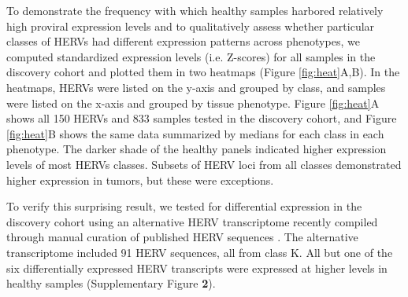 To demonstrate the frequency with which healthy samples harbored relatively high proviral expression levels and to qualitatively assess whether particular classes of HERVs had different expression patterns across phenotypes, we computed standardized expression levels (i.e. Z-scores) for all samples in the discovery cohort and plotted them in two heatmaps (Figure \ref{fig:heat}A,B).
In the heatmaps, HERVs were listed on the y-axis and grouped by class, and samples were listed on the x-axis and grouped by tissue phenotype.
Figure \ref{fig:heat}A shows all 150 HERVs and 833 samples tested in the discovery cohort, and Figure \ref{fig:heat}B shows the same data summarized by medians for each class in each phenotype.
The darker shade of the healthy panels indicated higher expression levels of most HERVs classes.
Subsets of HERV loci from all classes demonstrated higher expression in tumors, but these were exceptions.

To verify this surprising result, we tested for differential expression in the discovery cohort using an alternative HERV transcriptome recently compiled through manual curation of published HERV sequences \citep{Grabski2020}.
The alternative transcriptome included 91 HERV sequences, all from class K.
All but one of the six differentially expressed HERV transcripts were expressed at higher levels in healthy samples (Supplementary Figure \textbf{2}).

